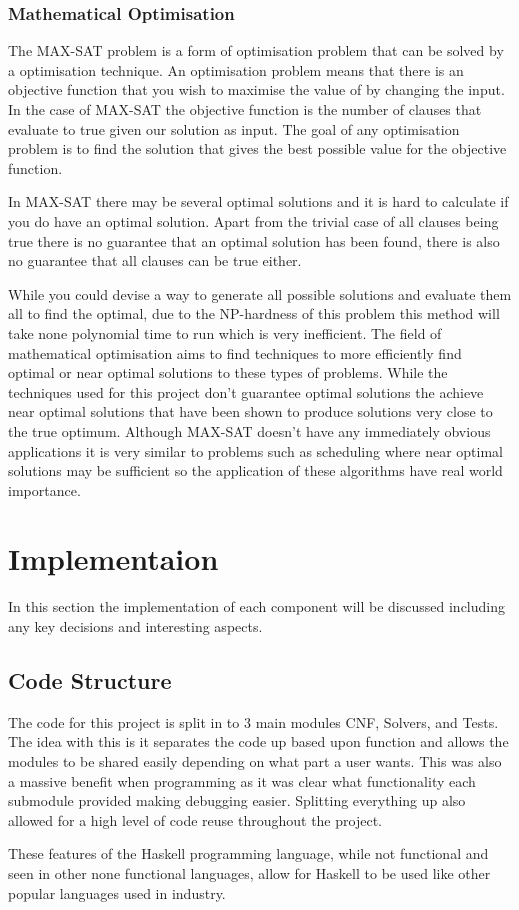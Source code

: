 \documentclass[a4paper]{article}
\begin{document}
\subsubsection{Mathematical Optimisation}
The MAX-SAT problem is a form of optimisation problem that can be solved by a optimisation technique.
An optimisation problem means that there is an objective function that you wish to maximise the value of by changing the input.
In the case of MAX-SAT the objective function is the number of clauses that evaluate to true given our solution as input.
The goal of any optimisation problem is to find the solution that gives the best possible value for the objective function.
\par
In MAX-SAT there may be several optimal solutions and it is hard to calculate if you do have an optimal solution.
Apart from the trivial case of all clauses being true there is no guarantee that an optimal solution has been found, there is also no guarantee that all clauses can be true either.
\par
While you could devise a way to generate all possible solutions and evaluate them all to find the optimal, due to the NP-hardness of this problem this method will take none polynomial time to run which is very inefficient.
The field of mathematical optimisation aims to find techniques to more efficiently find optimal or near optimal solutions to these types of problems.
While the techniques used for this project don't guarantee optimal solutions the achieve near optimal solutions that have been shown to produce solutions very close to the true optimum.
Although MAX-SAT doesn't have any immediately obvious applications it is very similar to problems such as scheduling where near optimal solutions may be sufficient so the application of these algorithms have real world importance.

\section{Implementaion}
In this section the implementation of each component will be discussed including any key decisions and interesting aspects.

\subsection{Code Structure}
The code for this project is split in to 3 main modules CNF, Solvers, and Tests.
The idea with this is it separates the code up based upon function and allows the modules to be shared easily depending on what part a user wants.
This was also a massive benefit when programming as it was clear what functionality each submodule provided making debugging easier.
Splitting everything up also allowed for a high level of code reuse throughout the project.
\par
These features of the Haskell programming language, while not functional and seen in other none functional languages, allow for Haskell to be used like other popular languages used in industry.
\end{document}
